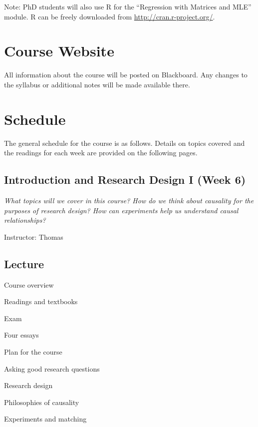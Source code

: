 \documentclass[11pt,a4paper]{article}
\newcommand{\thomas}{\vspace{1em}\noindent Instructor: Thomas\\}
\begin{document}
Note: PhD students will also use R for the ``Regression with Matrices and MLE'' module. R can be freely downloaded from \href{http://cran.r-project.org/}{http://cran.r-project.org/}.

\section{Course Website}
All information about the course will be posted on Blackboard. Any changes to the syllabus or additional notes will be made available there.





\clearpage
\section{Schedule}
The general schedule for the course is as follows. Details on topics covered and the readings for each week are provided on the following pages.

\secttoc

\clearpage

\subsection{Introduction and Research Design I (Week 6)}
\emph{What topics will we cover in this course? How do we think about causality for the purposes of research design? How can experiments help us understand causal relationships?}

\thomas

\subsection*{Lecture}

\begin{itemize*}
\item Course overview
    \begin{itemize*}
    \item Readings and textbooks
    \item Exam
    \item Four essays
    \item Plan for the course
    \end{itemize*}
\item Asking good research questions
\item Research design
\item Philosophies of causality
\item Experiments and matching
\end{itemize*}
\end{document}

